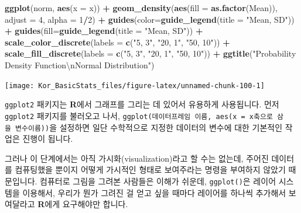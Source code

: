 \documentclass[]{book}
\newenvironment{Shaded}{\begin{snugshade}}{\end{snugshade}}
\newcommand{\CharTok}[1]{\textcolor[rgb]{0.31,0.60,0.02}{#1}}
\newcommand{\DataTypeTok}[1]{\textcolor[rgb]{0.13,0.29,0.53}{#1}}
\newcommand{\DecValTok}[1]{\textcolor[rgb]{0.00,0.00,0.81}{#1}}
\newcommand{\KeywordTok}[1]{\textcolor[rgb]{0.13,0.29,0.53}{\textbf{#1}}}
\newcommand{\NormalTok}[1]{#1}
\newcommand{\OperatorTok}[1]{\textcolor[rgb]{0.81,0.36,0.00}{\textbf{#1}}}
\newcommand{\StringTok}[1]{\textcolor[rgb]{0.31,0.60,0.02}{#1}}
\begin{document}
\begin{Shaded}
\begin{Highlighting}[]
\KeywordTok{ggplot}\NormalTok{(norm, }\KeywordTok{aes}\NormalTok{(}\DataTypeTok{x =}\NormalTok{ x)) }\OperatorTok{+}
\StringTok{  }\KeywordTok{geom_density}\NormalTok{(}\KeywordTok{aes}\NormalTok{(}\DataTypeTok{fill =} \KeywordTok{as.factor}\NormalTok{(Mean)), }\DataTypeTok{adjust =} \DecValTok{4}\NormalTok{, }\DataTypeTok{alpha =} \DecValTok{1}\OperatorTok{/}\DecValTok{2}\NormalTok{) }\OperatorTok{+}
\StringTok{  }\KeywordTok{guides}\NormalTok{(}\DataTypeTok{color=}\KeywordTok{guide_legend}\NormalTok{(}\DataTypeTok{title =} \StringTok{"Mean, SD"}\NormalTok{)) }\OperatorTok{+}
\StringTok{  }\KeywordTok{guides}\NormalTok{(}\DataTypeTok{fill=}\KeywordTok{guide_legend}\NormalTok{(}\DataTypeTok{title =} \StringTok{"Mean, SD"}\NormalTok{)) }\OperatorTok{+}
\StringTok{  }\KeywordTok{scale_color_discrete}\NormalTok{(}\DataTypeTok{labels =} \KeywordTok{c}\NormalTok{(}\StringTok{"5, 3"}\NormalTok{, }\StringTok{"20, 1"}\NormalTok{, }\StringTok{"50, 10"}\NormalTok{)) }\OperatorTok{+}
\StringTok{  }\KeywordTok{scale_fill_discrete}\NormalTok{(}\DataTypeTok{labels =} \KeywordTok{c}\NormalTok{(}\StringTok{"5, 3"}\NormalTok{, }\StringTok{"20, 1"}\NormalTok{, }\StringTok{"50, 10"}\NormalTok{)) }\OperatorTok{+}
\StringTok{  }\KeywordTok{ggtitle}\NormalTok{(}\StringTok{"Probability Density Function}\CharTok{\textbackslash{}n}\StringTok{Normal Distribution"}\NormalTok{)}
\end{Highlighting}
\end{Shaded}

\begin{center}\texttt{[image: Kor\_BasicStats\_files/figure-latex/unnamed-chunk-100-1]} \end{center}

\texttt{ggplot2} 패키지는 \textbf{R}에서 그래프를 그리는 데 있어서 유용하게 사용됩니다. 먼저 \texttt{ggplot2} 패키지를 불러오고 나서, \texttt{ggplot(데이터프레임\ 이름,\ aes(x\ =\ x축으로\ 삼을\ 변수이름))}을 설정하면 일단 수학적으로 지정한 데이터의 변수에 대한 기본적인 작업은 진행이 됩니다.

그러나 이 단계에서는 아직 가시화(visualization)라고 할 수는 없는데, 주어진 데이터를 컴퓨팅했을 뿐이지 어떻게 가시적인 형태로 보여주라는 명령을 부여하지 않았기 때문입니다. 컴퓨터로 그림을 그려본 사람들은 이해가 쉬운데, \texttt{ggplot()}은 레이어 시스템을 이용해서, 우리가 뭔가 그려진 걸 얻고 싶을 때마다 레이어를 하나씩 추가해서 보여달라고 \textbf{R}에게 요구해야만 합니다.
\end{document}
